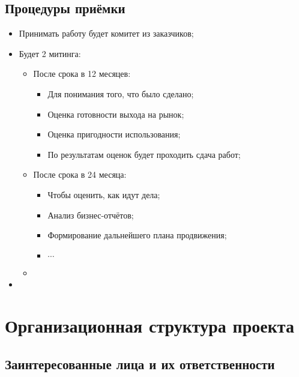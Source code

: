 \documentclass[a4paper,10pt]{article}
\begin{document}
\subsection{Процедуры приёмки}

    \begin{itemize}
        \item Принимать работу будет комитет из заказчиков;
        \item Будет 2 митинга:
            \begin{itemize}
                \item После срока в 12 месяцев:
                    \begin{itemize}
                        \item Для понимания того, что было сделано;
                        \item Оценка готовности выхода на рынок;
                        \item Оценка пригодности использования;
                        \item По результатам оценок будет проходить сдача работ;
                    \end{itemize}
                \item После срока в 24 месяца:
                    \begin{itemize}
                        \item Чтобы оценить, как идут дела;
                        \item Анализ бизнес-отчётов;
                        \item Формирование дальнейшего плана продвижения;
                        \item $\cdots$
                    \end{itemize}
                \item 
            \end{itemize}
        \item 
    \end{itemize}


\section{Организационная структура проекта}

\subsection{Заинтересованные лица и их ответственности}
\end{document}
